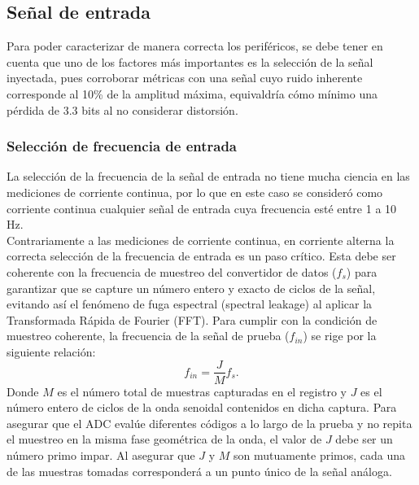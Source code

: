 \documentclass{article}
\begin{document}
\subsection{Señal de entrada}
Para poder caracterizar de manera correcta los periféricos, se debe tener en cuenta que uno de los factores más importantes es la selección de la señal inyectada, pues corroborar métricas con una señal cuyo ruido inherente corresponde al 10\% de la amplitud máxima, equivaldría cómo mínimo una pérdida de 3.3 bits al no considerar distorsión.
\subsubsection{Selección de frecuencia de entrada}
La selección de la frecuencia de la señal de entrada no tiene mucha ciencia en las mediciones de corriente continua, por lo que en este caso se consideró como corriente continua cualquier señal de entrada cuya frecuencia esté entre 1 a 10 Hz.\\
Contrariamente a las mediciones de corriente continua, en corriente alterna la correcta selección de la frecuencia de entrada es un paso crítico. Esta debe ser coherente con la frecuencia de muestreo del convertidor de datos ($f_s$) para garantizar que se capture un número entero y exacto de ciclos de la señal, evitando así el fenómeno de fuga espectral (spectral leakage) al aplicar la Transformada Rápida de Fourier (FFT). Para cumplir con la condición de muestreo coherente, la frecuencia de la señal de prueba ($f_{in}$) se rige por la siguiente relación:
\begin{equation}
    f_{in} = \frac{J}{M} f_s.
\end{equation}
Donde $M$ es el número total de muestras capturadas en el registro y $J$ es el número entero de ciclos de la onda senoidal contenidos en dicha captura. Para asegurar que el ADC evalúe diferentes códigos a lo largo de la prueba y no repita el muestreo en la misma fase geométrica de la onda, el valor de $J$ debe ser un número primo impar. Al asegurar que $J$ y $M$ son mutuamente primos, cada una de las muestras tomadas corresponderá a un punto único de la señal análoga.
\\
\end{document}
